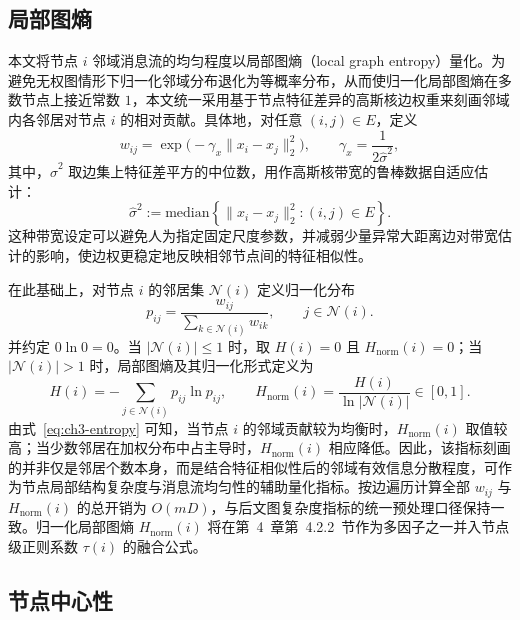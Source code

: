 \subsection{局部图熵}
\label{subsec:ch3-local-entropy}
\label{def:ch3-entropy}

本文将节点 $i$ 邻域消息流的均匀程度以局部图熵（local graph entropy）量化。为避免无权图情形下归一化邻域分布退化为等概率分布，从而使归一化局部图熵在多数节点上接近常数 $1$，本文统一采用基于节点特征差异的高斯核边权重来刻画邻域内各邻居对节点 $i$ 的相对贡献。具体地，对任意 $(i,j)\in E$，定义
\begin{equation}
  w_{ij}=\exp\!\bigl(-\gamma_x\|x_i-x_j\|_2^2\bigr),\qquad
  \gamma_x=\frac{1}{2\hat{\sigma}^2},
  \label{eq:ch3-gaussian-weight}
\end{equation}
其中，$\hat{\sigma}^2$ 取边集上特征差平方的中位数，用作高斯核带宽的鲁棒数据自适应估计：
\begin{equation}
  \hat{\sigma}^2
  :=
  \mathrm{median}\left\{\|x_i-x_j\|_2^2 : (i,j)\in E\right\}.
  \label{eq:ch3-gaussian-bandwidth}
\end{equation}
这种带宽设定可以避免人为指定固定尺度参数，并减弱少量异常大距离边对带宽估计的影响，使边权更稳定地反映相邻节点间的特征相似性。

在此基础上，对节点 $i$ 的邻居集 $\mathcal{N}(i)$ 定义归一化分布
\begin{equation}
  p_{ij}
  =
  \frac{w_{ij}}{\sum_{k\in\mathcal{N}(i)}w_{ik}},
  \qquad j\in\mathcal{N}(i).
  \label{eq:ch3-entropy-prob}
\end{equation}
并约定 $0\ln0=0$。当 $|\mathcal{N}(i)|\leq 1$ 时，取 $H(i)=0$ 且 $H_{\text{norm}}(i)=0$；当 $|\mathcal{N}(i)|>1$ 时，局部图熵及其归一化形式定义为
\begin{equation}
  H(i)
  =
  -\sum_{j\in\mathcal{N}(i)}p_{ij}\ln p_{ij},
  \qquad
  H_{\text{norm}}(i)
  =
  \frac{H(i)}{\ln|\mathcal{N}(i)|}\in[0,1].
  \label{eq:ch3-entropy}
\end{equation}
由式~\eqref{eq:ch3-entropy} 可知，当节点 $i$ 的邻域贡献较为均衡时，$H_{\text{norm}}(i)$ 取值较高；当少数邻居在加权分布中占主导时，$H_{\text{norm}}(i)$ 相应降低。因此，该指标刻画的并非仅是邻居个数本身，而是结合特征相似性后的邻域有效信息分散程度，可作为节点局部结构复杂度与消息流均匀性的辅助量化指标。按边遍历计算全部 $w_{ij}$ 与 $H_{\text{norm}}(i)$ 的总开销为 $O(mD)$，与后文图复杂度指标的统一预处理口径保持一致。归一化局部图熵 $H_{\text{norm}}(i)$ 将在第~4~章第~4.2.2~节作为多因子之一并入节点级正则系数 $\tau(i)$ 的融合公式。

\subsection{节点中心性}
\label{subsec:ch3-centrality}

